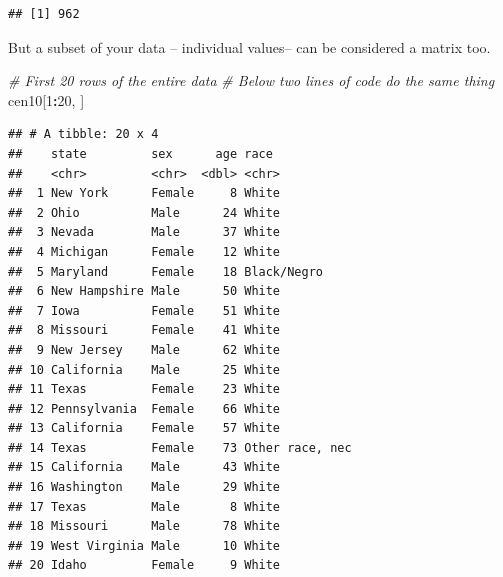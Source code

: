 \documentclass[
]{book}
\newenvironment{Shaded}{\begin{snugshade}}{\end{snugshade}}
\newcommand{\CommentTok}[1]{\textcolor[rgb]{0.56,0.35,0.01}{\textit{#1}}}
\newcommand{\DecValTok}[1]{\textcolor[rgb]{0.00,0.00,0.81}{#1}}
\newcommand{\KeywordTok}[1]{\textcolor[rgb]{0.13,0.29,0.53}{\textbf{#1}}}
\newcommand{\NormalTok}[1]{#1}
\newcommand{\OperatorTok}[1]{\textcolor[rgb]{0.81,0.36,0.00}{\textbf{#1}}}
\newcommand{\StringTok}[1]{\textcolor[rgb]{0.31,0.60,0.02}{#1}}
\theoremstyle{definition}
\theoremstyle{definition}
\theoremstyle{definition}
\theoremstyle{definition}
\theoremstyle{remark}
\begin{document}
\begin{verbatim}
## [1] 962
\end{verbatim}

But a subset of your data -- individual values-- can be considered a matrix too.

\begin{Shaded}
\begin{Highlighting}[]
\CommentTok{# First 20 rows of the entire data}
\CommentTok{# Below two lines of code do the same thing}
\NormalTok{cen10[}\DecValTok{1}\OperatorTok{:}\DecValTok{20}\NormalTok{, ]}
\end{Highlighting}
\end{Shaded}

\begin{verbatim}
## # A tibble: 20 x 4
##    state         sex      age race           
##    <chr>         <chr>  <dbl> <chr>          
##  1 New York      Female     8 White          
##  2 Ohio          Male      24 White          
##  3 Nevada        Male      37 White          
##  4 Michigan      Female    12 White          
##  5 Maryland      Female    18 Black/Negro    
##  6 New Hampshire Male      50 White          
##  7 Iowa          Female    51 White          
##  8 Missouri      Female    41 White          
##  9 New Jersey    Male      62 White          
## 10 California    Male      25 White          
## 11 Texas         Female    23 White          
## 12 Pennsylvania  Female    66 White          
## 13 California    Female    57 White          
## 14 Texas         Female    73 Other race, nec
## 15 California    Male      43 White          
## 16 Washington    Male      29 White          
## 17 Texas         Male       8 White          
## 18 Missouri      Male      78 White          
## 19 West Virginia Male      10 White          
## 20 Idaho         Female     9 White
\end{verbatim}

\begin{Shaded}
\end{Shaded}
\end{document}

